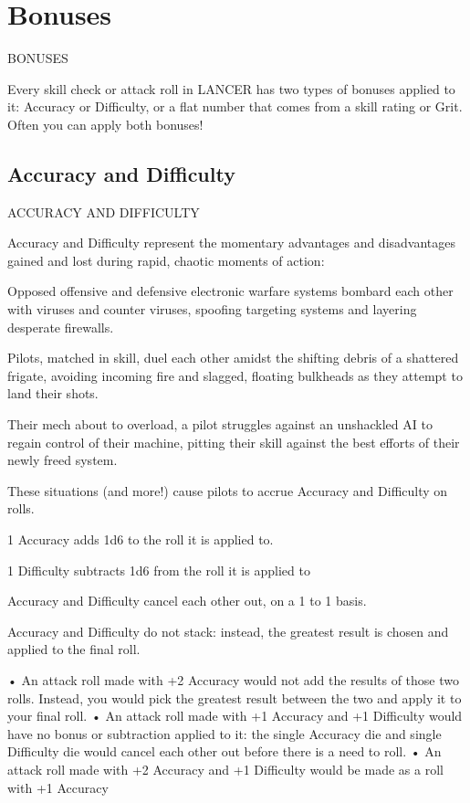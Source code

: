 \section{Bonuses}
   BONUSES  

Every skill check or attack roll in LANCER has two types of bonuses applied to it: Accuracy or  
Difficulty, or a flat number that comes from a skill rating or Grit. Often you can apply both bonuses!
 
\subsection{Accuracy and Difficulty}
                                ACCURACY AND DIFFICULTY  

Accuracy and Difficulty represent the momentary advantages and disadvantages gained and  
lost during rapid, chaotic moments of action:
 

Opposed offensive and defensive electronic warfare systems bombard each other with viruses  
and counter viruses, spoofing targeting systems and layering desperate firewalls.   

Pilots, matched in skill, duel each other amidst the shifting debris of a shattered frigate, avoiding  
incoming fire and slagged, floating bulkheads as they attempt to land their shots.   

Their mech about to overload, a pilot struggles against an unshackled AI to regain control of their  
machine, pitting their skill against the best efforts of their newly freed system.   

                                                                                                              


These situations (and more!) cause pilots to accrue Accuracy and Difficulty on rolls. 
 

1 Accuracy adds 1d6 to the roll it is applied to.
 
1 Difficulty subtracts 1d6 from the roll it is applied to
 
Accuracy and Difficulty cancel each other out, on a 1 to 1 basis.
 
Accuracy and Difficulty do not stack: instead, the greatest result is chosen and applied to the  
final roll.  
 
       •  An attack roll made with +2 Accuracy would not add the results of those two rolls.  
          Instead, you would pick the greatest result between the two and apply it to your final roll.  
       •  An attack roll made with +1 Accuracy and +1 Difficulty would have no bonus or  
         subtraction applied to it: the single Accuracy die and single Difficulty die would cancel  
          each other out before there is a need to roll.  
       •  An attack roll made with +2 Accuracy and +1 Difficulty would be made as a roll with +1  
         Accuracy  

